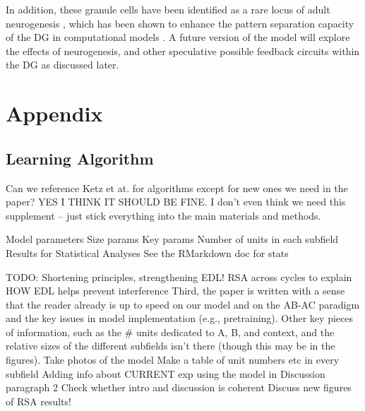 \documentclass[11pt,twoside]{article}
\newif\myifpdf
\begin{document}
In addition, these granule cells have been identified as a rare locus of adult neurogenesis \citep{neurogenesis}, which has been shown to enhance the pattern separation capacity of the DG in computational models \citep{Becker}.  A future version of the model will explore the effects of neurogenesis, and other speculative possible feedback circuits within the DG as discussed later.

\section{Appendix}

\subsection{Learning Algorithm}

Can we reference Ketz et at. for algorithms except for new ones we need in the paper? YES I THINK IT SHOULD BE FINE.  I don't even think we need this supplement -- just stick everything into the main materials and methods.

Model parameters
Size params
Key params
Number of units in each subfield
Results for Statistical Analyses
See the RMarkdown doc for stats


TODO:
Shortening principles, strengthening EDL!
RSA across cycles to explain HOW EDL helps prevent interference 
Third, the paper is written with a sense that the reader already is up to speed on our model and on the AB-AC paradigm and the key issues in model implementation (e.g., pretraining). Other key pieces of information, such as the \# units dedicated to A, B, and context, and the relative sizes of the different subfields isn't there (though this may be in the figures).  
Take photos of the model
Make a table of unit numbers etc in every subfield
Adding info about CURRENT exp using the model in Discussion paragraph 2
Check whether intro and discussion is coherent
Discuss new figures of RSA results!


\end{document}
